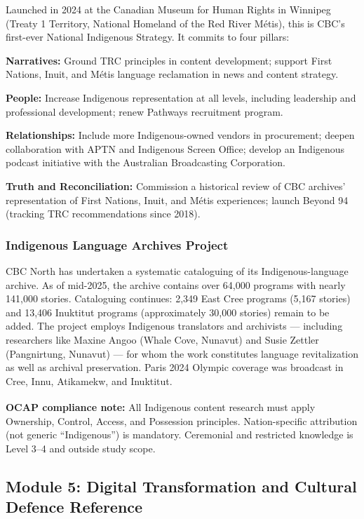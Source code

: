\documentclass[11pt,letterpaper]{article}
\begin{document}
Launched in 2024 at the Canadian Museum for Human Rights in Winnipeg (Treaty 1 Territory, National Homeland of the Red River M\'{e}tis), this is CBC's first-ever National Indigenous Strategy. It commits to four pillars:

\textbf{Narratives:} Ground TRC principles in content development; support First Nations, Inuit, and M\'{e}tis language reclamation in news and content strategy.

\textbf{People:} Increase Indigenous representation at all levels, including leadership and professional development; renew Pathways recruitment program.

\textbf{Relationships:} Include more Indigenous-owned vendors in procurement; deepen collaboration with APTN and Indigenous Screen Office; develop an Indigenous podcast initiative with the Australian Broadcasting Corporation.

\textbf{Truth and Reconciliation:} Commission a historical review of CBC archives' representation of First Nations, Inuit, and M\'{e}tis experiences; launch Beyond 94 (tracking TRC recommendations since 2018).

\subsubsection{Indigenous Language Archives Project}

CBC North has undertaken a systematic cataloguing of its Indigenous-language archive. As of mid-2025, the archive contains over 64,000 programs with nearly 141,000 stories. Cataloguing continues: 2,349 East Cree programs (5,167 stories) and 13,406 Inuktitut programs (approximately 30,000 stories) remain to be added. The project employs Indigenous translators and archivists --- including researchers like Maxine Angoo (Whale Cove, Nunavut) and Susie Zettler (Pangnirtung, Nunavut) --- for whom the work constitutes language revitalization as well as archival preservation. Paris 2024 Olympic coverage was broadcast in Cree, Innu, Atikamekw, and Inuktitut.

\textbf{OCAP\textsuperscript{\textregistered} compliance note:} All Indigenous content research must apply Ownership, Control, Access, and Possession principles. Nation-specific attribution (not generic ``Indigenous'') is mandatory. Ceremonial and restricted knowledge is Level 3--4 and outside study scope.

\subsection{Module 5: Digital Transformation and Cultural Defence Reference}
\end{document}
